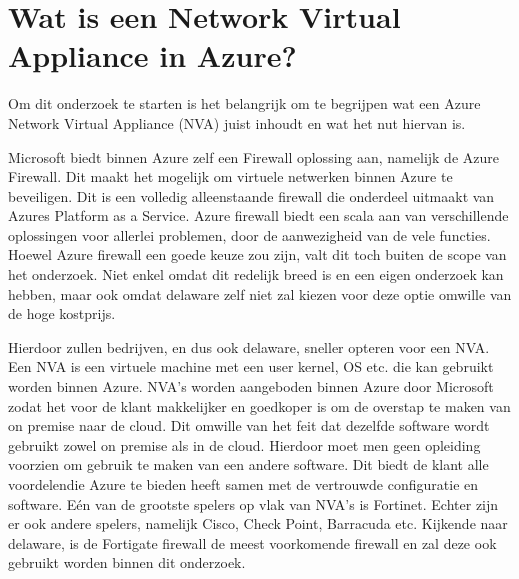 \newpage
\section{Wat is een Network Virtual Appliance in Azure?}
Om dit onderzoek te starten is het belangrijk om te begrijpen wat een Azure Network Virtual Appliance (NVA) juist inhoudt en wat het nut hiervan is.

Microsoft biedt binnen Azure zelf een Firewall oplossing aan, namelijk de Azure Firewall. Dit maakt het mogelijk om virtuele netwerken binnen Azure te beveiligen. \autocite{Cooke} Dit is een volledig alleenstaande firewall die onderdeel uitmaakt van Azures Platform as a Service. Azure firewall biedt een scala aan van verschillende oplossingen voor allerlei problemen, door de aanwezigheid van de vele functies. \autocite{Seferlis2018} Hoewel Azure firewall een goede keuze zou zijn, valt dit toch buiten de scope van het onderzoek. Niet enkel omdat dit redelijk breed is en een eigen onderzoek kan hebben, maar ook omdat delaware zelf niet zal kiezen voor deze optie omwille van de hoge kostprijs.

Hierdoor zullen bedrijven, en dus ook delaware, sneller opteren voor een NVA. Een NVA is een virtuele machine met een user kernel, OS etc. die kan gebruikt worden binnen Azure. NVA's worden aangeboden binnen Azure door Microsoft zodat het voor de klant makkelijker en goedkoper is om de overstap te maken van on premise naar de cloud. Dit omwille van het feit dat dezelfde software wordt gebruikt zowel on premise als in de cloud. Hierdoor moet men geen opleiding voorzien om gebruik te maken van een andere software. Dit biedt de klant alle voordelendie Azure te bieden heeft samen met de vertrouwde configuratie en software. Eén van de grootste spelers op vlak van NVA's is Fortinet. Echter zijn er ook andere spelers, namelijk Cisco, Check Point, Barracuda etc. \autocite{MicrosoftNVA} Kijkende naar delaware, is de Fortigate firewall de meest voorkomende firewall en zal deze ook gebruikt worden binnen dit onderzoek. 

